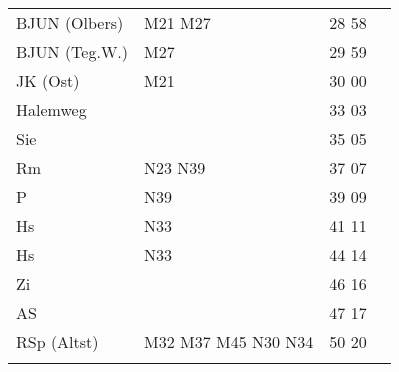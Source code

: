 \begin{tabular}{!{\color{schiefergrau}\vrule width 3pt}*{4}{l!{\color{schiefergrau}\vrule width 3pt}}}
BJUN (Olbers)& \mbus{} M21 M27                             & 28 58 &       \\
BJUN (Teg.W.)& \mbus{} M27                                 & 29 59 &       \\
JK (Ost)     & \mbus{} M21                                 & 30 00 &       \\
Halemweg     &                                             & 33 03 &       \\
Sie          &                                             & 35 05 &       \\
Rm           & \nbus{} N23 N39                             & 37 07 &       \\
P            & \nbus{} N39                                 & 39 09 &       \\
Hs           & \nbus{} N33                                 & 41 11 &       \\
\hline
Hs           & \nbus{} N33                                 & 44 14 &       \\
Zi           &                                             & 46 16 &       \\
AS           &                                             & 47 17 &       \\
RSp (Altst)  & \mbus{} M32 M37 M45 \nbus{} N30 N34         & 50 20 &       \\
\myhline
\end{tabular}
